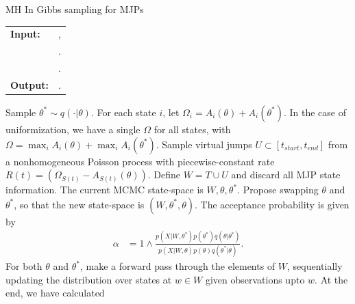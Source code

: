 \begin{algorithm}[H]
   \caption{MH In Gibbs sampling for MJPs }
   \label{alg:MH_improved}
  \begin{tabular}{l l}
   \textbf{Input:  } & \text{A set of partial and noisy observations $X$}, \\
                      & \text{The previous MJP path $S(t) = (S, T)$, the previous MJP parameters $\theta$}.\\ 
                     & \text{A  Metropolis-Hasting proposal $q(. | \theta)$}.\\
   \textbf{Output:  }& \text{A new MJP trajectory $\tilde{S} (t) = (\tilde{S}, \tilde{T})$, New MJP parameters $\tilde{\theta}$}.\\
   \hline
   \end{tabular}
   \begin{algorithmic}[1]
      \State Sample $\theta^* \sim q(\cdot| \theta)$. For each state $i$, 
      let $\Omega_i = A_i(\theta) + A_i(\theta^*)$. In the case of uniformization, we
      have a single $\Omega$ for all states, with $\Omega = \max_i A_i(\theta) + \max_i A_i(\theta^*)$.
    \State Sample virtual jumps $U\subset[t_{start}, t_{end}]$ from a nonhomogeneous Poisson process with 
    piecewise-constant rate $R(t) = (\Omega_{S(t)} - A_{S(t)}(\theta))$. 
    Define $W = T \cup U$ and discard all MJP state information.
    \State The current MCMC state-space is $W,\theta,\theta^*$. Propose swapping
    $\theta$ and $\theta^*$, so that the new state-space is 
    $(W, \theta^*, \theta)$. The acceptance probability is given by
        \begin{align*}
        \alpha %
        &=  1 \wedge \frac{p(X| W,\theta^*)p(\theta^*)q(\theta|\theta^*)}
        {p(X| W,\theta)p(\theta) q(\theta^*|\theta)}.
        \end{align*}
    \State For both $\theta$ and $\theta^*$, make a forward pass through the 
    elements of $W$, sequentially updating the distribution over states at 
    $w \in W$ given observations upto $w$. At the end, we have calculated

\end{algorithmic}
\end{algorithm}
